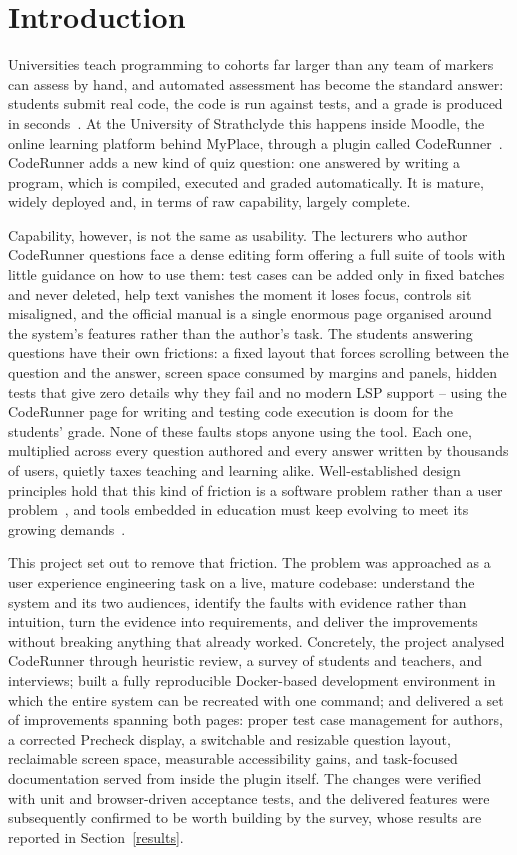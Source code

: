 \section{Introduction}

Universities teach programming to cohorts far larger than any team of markers can assess by hand, and automated assessment has become the standard answer: students submit real code, the code is run against tests, and a grade is produced in seconds~\cite{reviewrecentsystems2010}. At the University of Strathclyde this happens inside Moodle, the online learning platform behind MyPlace, through a plugin called CodeRunner~\cite{CodeRunner2016}. CodeRunner adds a new kind of quiz question: one answered by writing a program, which is compiled, executed and graded automatically. It is mature, widely deployed and, in terms of raw capability, largely complete.

Capability, however, is not the same as usability. The lecturers who author CodeRunner questions face a dense editing form offering a full suite of tools with little guidance on how to use them: test cases can be added only in fixed batches and never deleted, help text vanishes the moment it loses focus, controls sit misaligned, and the official manual is a single enormous page organised around the system's features rather than the author's task. The students answering questions have their own frictions: a fixed layout that forces scrolling between the question and the answer, screen space consumed by margins and panels, hidden tests that give zero details why they fail and no modern LSP support -- using the CodeRunner page for writing and testing code execution is doom for the students' grade. None of these faults stops anyone using the tool. Each one, multiplied across every question authored and every answer written by thousands of users, quietly taxes teaching and learning alike. Well-established design principles hold that this kind of friction is a software problem rather than a user problem~\cite{designofeveryday}, and tools embedded in education must keep evolving to meet its growing demands~\cite{pieterse2013automated}.

This project set out to remove that friction. The problem was approached as a user experience engineering task on a live, mature codebase: understand the system and its two audiences, identify the faults with evidence rather than intuition, turn the evidence into requirements, and deliver the improvements without breaking anything that already worked. Concretely, the project analysed CodeRunner through heuristic review, a survey of students and teachers, and interviews; built a fully reproducible Docker-based development environment in which the entire system can be recreated with one command; and delivered a set of improvements spanning both pages: proper test case management for authors, a corrected Precheck display, a switchable and resizable question layout, reclaimable screen space, measurable accessibility gains, and task-focused documentation served from inside the plugin itself. The changes were verified with unit and browser-driven acceptance tests, and the delivered features were subsequently confirmed to be worth building by the survey, whose results are reported in Section~\ref{results}.

